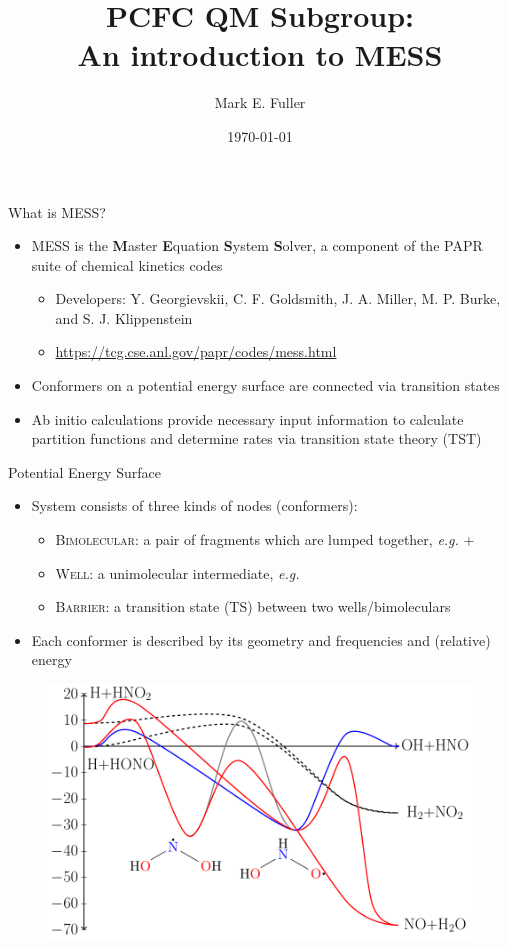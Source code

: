 \documentclass[10pt,presentation]{beamer}
\title[Introduction to \textsc{MESS}]{PCFC QM Subgroup:\\An introduction to \textsc{MESS}}
\author{Mark E. Fuller}
\institute{Physico-Chemical Fundamentals of Combustion}
\date{\today}
\begin{document}
\begin{frame}{What is \textsc{MESS}?}
  \begin{itemize}
   \item \textsc{MESS} is the \textbf{M}aster \textbf{E}quation \textbf{S}ystem \textbf{S}olver, a component of the \textsc{PAPR} suite of chemical kinetics codes
    \begin{itemize}
     \item Developers: Y. Georgievskii, C. F. Goldsmith, J. A. Miller, M. P. Burke, and S. J. Klippenstein 
     \item \url{https://tcg.cse.anl.gov/papr/codes/mess.html}
    \end{itemize}
   \item Conformers on a potential energy surface are connected via transition states
   \item Ab initio calculations provide necessary input information to calculate partition functions and determine rates via transition state theory (TST)
  \end{itemize}
\end{frame}

\begin{frame}{ Potential Energy Surface}
  \begin{itemize}
   \item System consists of three kinds of nodes (conformers):
    \begin{itemize}
     \item \textsc{Bimolecular}: a pair of fragments which are lumped together, \textit{e.g.} +
     \item \textsc{Well}: a unimolecular intermediate, \textit{e.g.} 
     \item \textsc{Barrier}: a transition state (TS) between two wells/bimoleculars
    \end{itemize}
   \item Each conformer is described by its geometry and frequencies and (relative) energy
  \end{itemize}
  \begin{figure}
    \centering
    \includegraphics[width=0.6\linewidth]{figures/PES_H_HONO_1_lumpHONO.pdf}
  \end{figure}
\end{frame}
\end{document}
